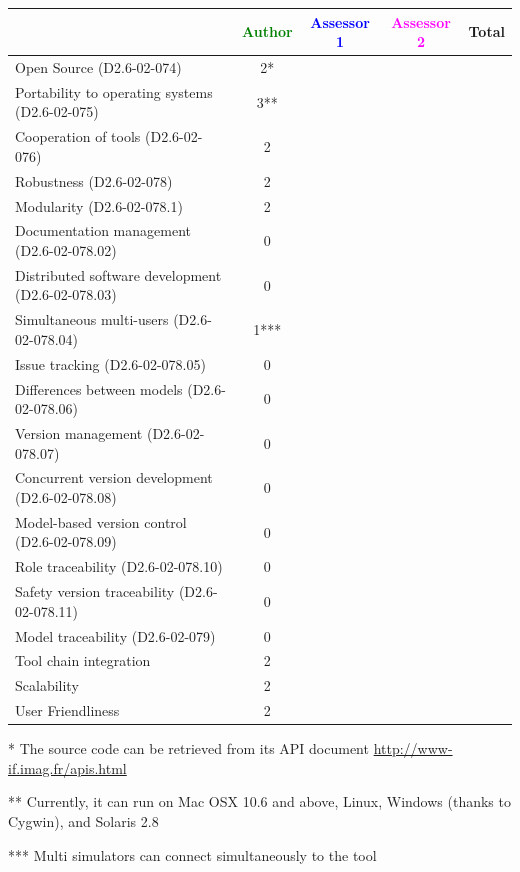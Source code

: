 \begin{tabular}{|l | c | c | c | c|}
\hline
& \textcolor{green}{Author} & \textcolor{blue}{Assessor 1} & \textcolor{magenta}{Assessor 2} & Total \\
\hline 
Open Source (D2.6-02-074) & 2* & & &  \\
\hline 
Portability to operating systems (D2.6-02-075) & 3** & & &  \\
\hline
Cooperation of tools (D2.6-02-076) & 2 & & &  \\
\hline
Robustness (D2.6-02-078) & 2 & & & \\
\hline
Modularity (D2.6-02-078.1) & 2 & & & \\
\hline
Documentation management (D2.6-02-078.02) & 0 & & & \\
\hline
Distributed software development (D2.6-02-078.03)  & 0 & & & \\
\hline
Simultaneous multi-users (D2.6-02-078.04)   & 1*** & & & \\
\hline
Issue tracking (D2.6-02-078.05) & 0 & & & \\
\hline
Differences between models (D2.6-02-078.06) & 0 & & & \\
\hline
Version management (D2.6-02-078.07) & 0 & & & \\
\hline
Concurrent version development (D2.6-02-078.08) & 0 & & & \\
\hline
Model-based version control (D2.6-02-078.09) & 0 & & & \\
\hline
Role traceability (D2.6-02-078.10) & 0 & & & \\
\hline
Safety version traceability (D2.6-02-078.11) & 0 & & & \\
\hline
Model traceability (D2.6-02-079) & 0 & & & \\
\hline
Tool chain integration & 2 & & & \\
\hline
Scalability & 2 & & & \\
\hline
User Friendliness & 2 & & & \\
\hline
\end{tabular}


\begin{author_comment}

	* The source code can be retrieved from its API document \url{http://www-if.imag.fr/apis.html}
	
	** Currently, it can run on Mac OSX 10.6 and above, Linux, Windows (thanks to Cygwin), and Solaris 2.8
	
	
	*** Multi simulators can connect simultaneously to the tool
	
\end{author_comment}

